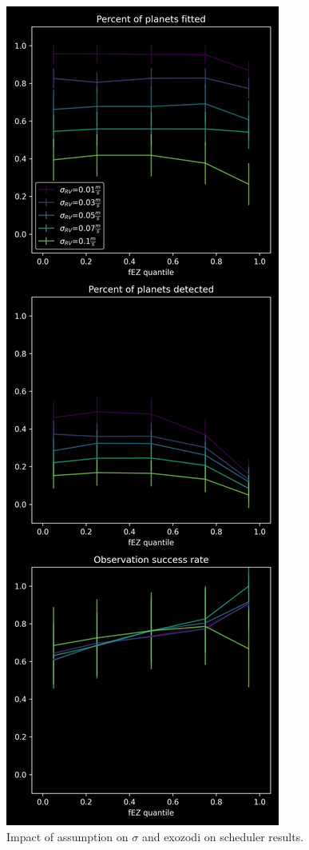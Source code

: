 \begin{figure}
  \begin{center}
    \includegraphics[height=0.9\textheight]{ch4/figures/fEZ_impact.png}
  \end{center}
  \caption{
    Impact of assumption on $\sigma$ and exozodi on scheduler results.
  }
  \label{fig:sigma_nEZ_impact_plots}
\end{figure}

